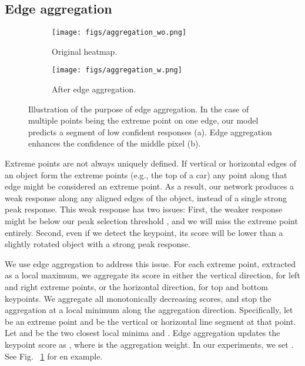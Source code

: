 \documentclass[10pt,twocolumn,letterpaper]{article}
\begin{document}
\subsection{Edge aggregation}

{
\begin{figure}[t]
\begin{subfigure}[b]{0.235\textwidth}
\begin{center}
   \texttt{[image: figs/aggregation\_wo.png]}
   \caption{Original heatmap.}
\end{center}
\end{subfigure} \hfill
\begin{subfigure}[b]{0.235\textwidth}
\begin{center}
   \texttt{[image: figs/aggregation\_w.png]}
   \caption{After edge aggregation.}
\end{center}
\end{subfigure}
   \caption{Illustration of the purpose of edge aggregation. In the case of multiple points being the extreme point on one edge, our model predicts a segment of low confident responses (a). Edge aggregation enhances the confidence of the middle pixel (b).}
\label{fig:aggregation}
\end{figure}
}

\label{sec:edgeAggr}
Extreme points are not always uniquely defined.
If vertical or horizontal edges of an object form the extreme points (e.g., the top of a car) any point along that edge might be considered an extreme point.
As a result, our network produces a weak response along any aligned edges of the object, instead of a single strong peak response.
This weak response has two issues: First, the weaker response might be below our peak selection threshold , and we will miss the extreme point entirely. Second, even if we detect the keypoint, its score will be lower than a slightly rotated object with a strong peak response.

We use edge aggregation to address this issue.
For each extreme point, extracted as a local maximum, we aggregate its score in either the vertical direction, for left and right extreme points, or the horizontal direction, for top and bottom keypoints.
We aggregate all monotonically decreasing scores, and stop the aggregation at a local minimum along the aggregation direction.
Specifically, let  be an extreme point and  be the vertical or horizontal line segment at that point.
Let  and  be the two closest local minima  and .
Edge aggregation updates the keypoint score as , where  is the aggregation weight.
In our experiments, we set .
See Fig. ~\ref{fig:aggregation} for en example.
\end{document}
